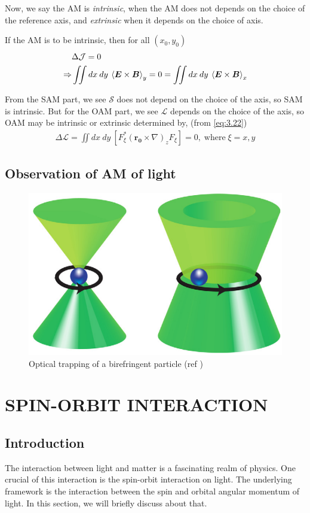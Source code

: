 \documentclass[11pt,a4paper]{article}
\numberwithin{equation}{section}
\begin{document}
Now, we say the AM is \textit{intrinsic}, when the AM does not depends on the choice of the reference axis, and \textit{extrinsic} when it depends on the choice of axis.

If the AM is to be intrinsic, then for all $(x_0,y_0)$
\begin{align}
	&\Delta\mathcal{J}=0\nonumber\\
	\Rightarrow &\iint  dx\:dy\: \expval{\boldsymbol{E}\times\boldsymbol{B}}_y = 0 = \iint  dx\:dy\: \expval{\boldsymbol{E}\times\boldsymbol{B}}_x \label{eq:3.40}
\end{align} 

From the SAM part, we see $\mathcal{S}$ does not depend on the choice of the axis, so SAM is intrinsic. But for the OAM part, we see $\mathcal{L}$ depends on the choice of the axis, so OAM may be intrinsic or extrinsic determined by, (from \ref{eq:3.22})
\begin{align}
	\Delta \mathcal{L}=
	\iint  dx\:dy\: \left[F_\xi^\ast\left(\boldsymbol{r_0}\times\nabla\right)_zF_\xi\right] = 0, \;\text{where}\;\xi=x,y
\end{align}

\subsection{Observation of AM of light}
\cite{padgett 11}
\begin{figure}
	\centering
	\includegraphics[width=0.5\linewidth]{"optical trapping"}
	\caption{Optical trapping of a birefringent particle (ref \cite{yao 11})}
	\label{fig:optical-trapping}
\end{figure}


\clearpage

\section{SPIN-ORBIT INTERACTION}

\subsection{Introduction}
The interaction between light and matter is a fascinating realm of physics. One crucial of this interaction is the spin-orbit interaction on light. The underlying framework is the interaction between the spin and  orbital angular momentum of light. In this section, we will briefly discuss about that.
\end{document}
